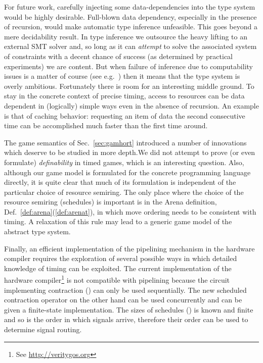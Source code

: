 \documentclass{article}
\begin{document}
For future work, carefully injecting some data-dependencies into the type system would be highly desirable. Full-blown data dependency, especially in the presence of recursion, would make automatic type inference unfeasible. This goes beyond a mere decidability result. In type inference we outsource the heavy lifting to an external SMT solver and, so long as it can \emph{attempt} to solve the associated system of constraints with a decent chance of success (as determined by practical experiments) we are content. But when failure of inference due to computability issues is a matter of course (see e.g.~\cite{DBLP:conf/popl/LagoP13}) then it means that the type system is overly ambitious. Fortunately there is room for an interesting middle ground. To stay in the concrete context of precise timing, access to resources can be data dependent in (logically) simple ways even in the absence of recursion. An example is that of caching behavior: requesting an item of data the second consecutive time can be accomplished much faster than the first time around. 

The game semantics of Sec.~\ref{sec:gamhort} introduced a number of innovations which deserve to be studied in more depth.We did not attempt to prove (or even formulate) \emph{definability} in timed games, which is an interesting question. Also, although our game model is formulated for the concrete programming language directly, it is quite clear that much of its formulation is independent of the particular choice of resource semiring. The only place where the choice of the resource semiring (schedules) is important is in the Arena definition, Def.~\ref{def:arena}(\ref{def:arenat}), in which move ordering needs to be consistent with timing. A relaxation of this rule may lead to a generic  game model of the abstract type system. 

Finally, an efficient implementation of the pipelining mechanism in the hardware compiler requires the exploration of several possible ways in which detailed knowledge of timing can be exploited. The current implementation of the hardware compiler\footnote{See \url{http://veritygos.org}} is not compatible with pipelining because the circuit implementing contraction () can only be used sequentially. The new scheduled contraction operator  on the other hand can be used concurrently and can be given a finite-state implementation. The sizes of schedules () is known and finite and so is the order in which signals arrive, therefore their order can be used to determine signal routing. 
\end{document}
